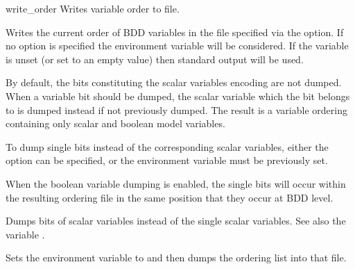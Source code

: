 \begin{nusmvCommand} {write\_order} {Writes variable order to file.}


Writes the current order of BDD variables in the file specified via
the  option. If no option is specified the environment
variable  will be considered. If the
variable  is unset (or set to an empty
value) then standard output will be used.

By default, the bits constituting the scalar variables encoding are
not dumped. When a variable bit should be dumped, the scalar variable
which the bit belongs to is dumped instead if not previously dumped. 
The result is a variable ordering containing only scalar and
boolean model variables.

To dump single bits instead of the corresponding scalar variables,
either the option  can be specified, or the environment
variable  must be previously set.

When the boolean variable dumping is enabled, the single bits will occur
within the resulting ordering file in the same position that they 
occur at BDD level. 

\begin{cmdOpt}
 {Dumps bits of scalar variables instead of the single
scalar variables. See also the variable .}

 {Sets the environment variable
 to  and then dumps the
ordering list into that file.}


\end{cmdOpt}
\end{nusmvCommand}
